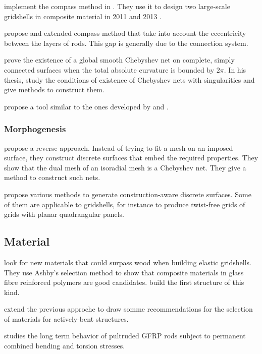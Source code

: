 implement the compass method in \grasshopper{}. They use it to design two large-scale gridshells in composite material in 2011 \cite{Baverel2012} and 2013 \Cite{DuPeloux2016}.

 propose and extended compass method that take into account the eccentricity between the layers of rods. This gap is generally due to the connection system.

 prove the existence of a global smooth Chebyshev net on complete, simply connected surfaces when the total absolute curvature is bounded by $2\pi$. In his thesis,  study the conditions of existence of Chebyshev nets with singularities and give methods to construct them.

 propose a tool similar to the ones developed by  and .

\subsubsection{Morphogenesis}

 propose a reverse approach. Instead of trying to fit a mesh on an imposed surface, they construct discrete surfaces that embed the required properties. They show that the dual mesh of an isoradial mesh is a Chebyshev net. They give a method to construct such nets.

 propose various methods to generate construction-aware discrete surfaces. Some of them are applicable to gridshells, for instance to produce twist-free grids of grids with planar quadrangular panels.

\subsection{Material}

 look for new materials that could surpass wood when building elastic gridshells. They use Ashby's selection method to show that composite materials in glass fibre reinforced polymers are good candidates.  build the first structure of this kind.

 extend the previous approche to draw somme recommendations for the selection of materials for actively-bent structures.

 studies the long term behavior of pultruded GFRP rods subject to permanent combined bending and torsion stresses.

